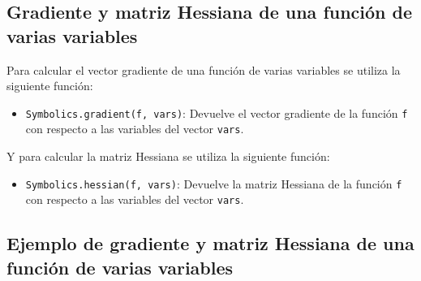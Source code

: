 \documentclass[
  letterpaper,
  DIV=11,
  numbers=noendperiod]{scrreprt}
\providecommand{\tightlist}{%
  \setlength{\itemsep}{0pt}\setlength{\parskip}{0pt}}\usepackage{longtable,booktabs,array}
\begin{document}
\hypertarget{gradiente-y-matriz-hessiana-de-una-funciuxf3n-de-varias-variables}{%
\subsection{Gradiente y matriz Hessiana de una función de varias
variables}\label{gradiente-y-matriz-hessiana-de-una-funciuxf3n-de-varias-variables}}

Para calcular el vector gradiente de una función de varias variables se
utiliza la siguiente función:

\begin{itemize}
\tightlist
\item
  \texttt{Symbolics.gradient(f,\ vars)}: Devuelve el vector gradiente de
  la función \texttt{f} con respecto a las variables del vector
  \texttt{vars}.
\end{itemize}

Y para calcular la matriz Hessiana se utiliza la siguiente función:

\begin{itemize}
\tightlist
\item
  \texttt{Symbolics.hessian(f,\ vars)}: Devuelve la matriz Hessiana de
  la función \texttt{f} con respecto a las variables del vector
  \texttt{vars}.
\end{itemize}

\hypertarget{ejemplo-de-gradiente-y-matriz-hessiana-de-una-funciuxf3n-de-varias-variables}{%
\subsection{Ejemplo de gradiente y matriz Hessiana de una función de
varias
variables}\label{ejemplo-de-gradiente-y-matriz-hessiana-de-una-funciuxf3n-de-varias-variables}}
\end{document}
